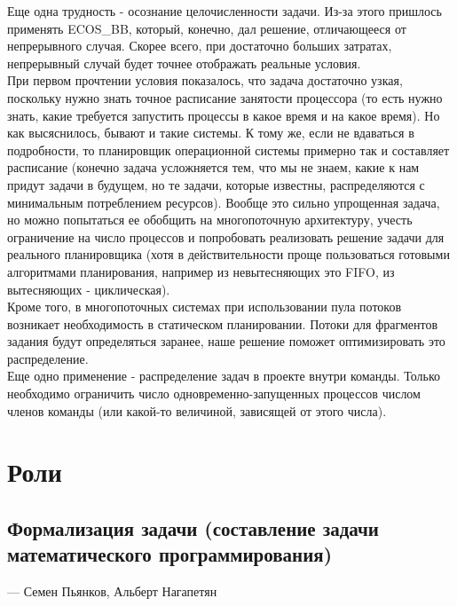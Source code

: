 \documentclass{article}
\begin{document}
Еще одна трудность - осознание целочисленности задачи. Из-за этого пришлось применять ECOS\_BB, который, конечно, дал решение, отличающееся от непрерывного случая. Скорее всего, при достаточно больших затратах, непрерывный случай будет точнее отображать реальные условия.\\

При первом прочтении условия показалось, что задача достаточно узкая, поскольку нужно знать точное расписание занятости процессора (то есть нужно знать, какие требуется запустить процессы в какое время и на какое время). Но как высяснилось, бывают и такие системы. К тому же, если не вдаваться в подробности, то планировщик операционной системы примерно так и составляет расписание (конечно задача усложняется тем, что мы не знаем, какие к нам придут задачи в будущем, но те задачи, которые известны, распределяются с минимальным потреблением ресурсов). Вообще это сильно упрощенная задача, но можно попытаться ее обобщить на многопоточную архитектуру, учесть ограничение на число процессов и попробовать реализовать решение задачи для реального планировщика (хотя в действительности проще пользоваться готовыми алгоритмами планирования, например из невытесняющих это FIFO, из вытесняющих - циклическая).\\

Кроме того, в многопоточных системах при использовании пула потоков возникает необходимость в статическом планировании. Потоки для фрагментов задания будут определяться заранее, наше решение поможет оптимизировать это распределение.\\

Еще одно применение - распределение задач в проекте внутри команды. Только необходимо ограничить число одновременно-запущенных процессов числом членов команды (или какой-то величиной, зависящей от этого числа).\\


\section{}

\section{Роли}

\subsection{Формализация задачи (составление задачи математического программирования)} --- Семен Пьянков, Альберт Нагапетян
\end{document}
